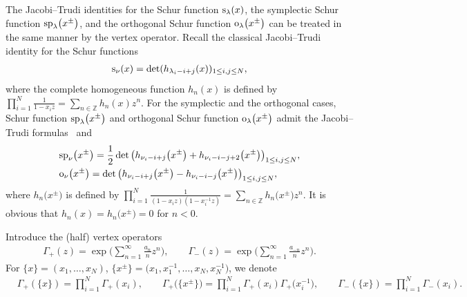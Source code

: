 \documentclass[10pt,a4paper]{amsart}
\numberwithin{equation}{section}
\begin{document}
The Jacobi--Trudi identities for the Schur function ${\rm s}_\lambda(x)$, the symplectic Schur function ${\rm sp}_\lambda\big(x^{\pm}\big)$, and the orthogonal Schur function ${\rm o}_\lambda\big(x^{\pm}\big)$
can be treated in the same manner by the vertex operator. Recall the classical Jacobi--Trudi identity for the Schur functions~\cite[formula~(3.4)]{Mac1995}
\begin{align}\label{e:JT1}
{\rm s}_\nu(x)=\det(h_{\lambda_i-i+j}(x))_{1\leq i,j\leq N},
\end{align}
where the complete homogeneous function $h_n(x)$ is defined by $\prod^N_{i=1}\frac{1}{1-x_iz}=\sum_{n\in \mathbb{Z}}h_n(x)z^n$. For the symplectic and the orthogonal cases, Schur function ${\rm sp}_\lambda\big(x^{\pm}\big)$ and orthogonal Schur function ${\rm o}_\lambda\big(x^{\pm}\big)$ admit the Jacobi--Trudi formulas~\cite[Theorems~1.3.2 and~1.3.3]{KT1987} and \cite[formulas~(4.1) and~(4.2)]{JN2015}
\begin{align}
&\label{e:JT2}{\rm sp}_\nu\big(x^{\pm}\big)=\frac{1}{2}\det\big(h_{\nu_i-i+j}\big(x^{\pm}\big)+h_{\nu_{i}-i-j+2}\big(x^{\pm}\big)\big)_{1\leq i,j\leq N},\\
&\label{e:JT3}{\rm o}_\nu\big(x^{\pm}\big)=\det\big(h_{\nu_i-i+j}\big(x^{\pm}\big)-h_{\nu_{i}-i-j}\big(x^{\pm}\big)\big)_{1\leq i,j\leq N},
\end{align}
where $h_n\big(x^{\pm}\big)$ \cite{Ba1996,JN2015,Wey1946} is defined by $\prod^N_{i=1}\frac{1}{(1-x_iz)(1-x^{-1}_iz)}=\sum_{n\in \mathbb{Z}}h_n\big(x^{\pm}\big)z^n$. It is obvious that $h_n(x)=h_n\big(x^{\pm}\big)=0$ for $n<0$.

Introduce the (half) vertex operators
\begin{align}
\Gamma_+(z)=\exp\Biggl(\sum^\infty_{n=1}\frac{a_n}{n}z^n\Biggr), \qquad
\Gamma_-(z)=\exp\Biggl(\sum^\infty_{n=1}\frac{a_{-n}}{n}z^n\Biggr).\label{e:eq10}
\end{align}
For $\{x\}=(x_1,\dots,x_N)$, $\big\{x^{\pm}\big\}=\big(x_1,x^{-1}_1,\dots,x_N,x^{-1}_N\big)$, we denote
\begin{align*}
&\Gamma_+(\{x\})=\prod^{N}_{i=1}\Gamma_+(x_i),\qquad
\Gamma_+\big(\big\{x^{\pm}\big\}\big)=\prod^{N}_{i=1}\Gamma_+(x_i)\Gamma_+\big(x^{-1}_i\big),\qquad
\Gamma_-(\{x\})=\prod^{N}_{i=1}\Gamma_-(x_i).%
\end{align*}
\end{document}
